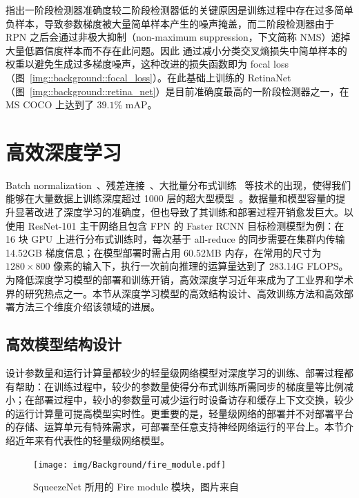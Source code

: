 \documentclass[
  fontset = mac,
]{shtthesis}
\begin{document}
\citet{lin2017focal} 指出一阶段检测器准确度较二阶段检测器低的关键原因是训练过程中存在过多简单负样本，导致参数梯度被大量简单样本产生的噪声掩盖，而二阶段检测器由于 RPN 之后会通过非极大抑制（non-maximum suppression，下文简称 NMS）滤掉大量低置信度样本而不存在此问题。因此 \citet{lin2017focal} 通过减小分类交叉熵损失中简单样本的权重以避免生成过多梯度噪声，这种改进的损失函数即为 focal loss （图~\ref{img::background::focal_loss}）。在此基础上训练的 RetinaNet （图~\ref{img::background::retina_net}）是目前准确度最高的一阶段检测器之一，在 MS COCO 上达到了 $39.1\%$ mAP。
\section{高效深度学习}
Batch normalization~\citep{ioffe2015batch}、残差连接~\citep{He_2016}、大批量分布式训练~\citep{goyal2017accurate} 等技术的出现，使得我们能够在大量数据上训练深度超过 1000 层的超大型模型~\citep{He_2016}。数据量和模型容量的提升显著改进了深度学习的准确度，但也导致了其训练和部署过程开销愈发巨大。以使用 ResNet-101 主干网络且包含 FPN 的 Faster RCNN 目标检测模型为例：在 16 块 GPU 上进行分布式训练时，每次基于 all-reduce 的同步需要在集群内传输 14.52GB 梯度信息；在模型部署时需占用 60.52MB 内存，在常用的尺寸为 $1280 \times 800$ 像素的输入下，执行一次前向推理的运算量达到了 283.14G FLOPS。为降低深度学习模型的部署和训练开销，高效深度学习近年来成为了工业界和学术界的研究热点之一。本节从深度学习模型的高效结构设计、高效训练方法和高效部署方法三个维度介绍该领域的进展。
\subsection{高效模型结构设计}
设计参数量和运行计算量都较少的轻量级网络模型对深度学习的训练、部署过程都有帮助：在训练过程中，较少的参数量使得分布式训练所需同步的梯度量等比例减小；在部署过程中，较小的参数量可减少运行时设备访存和缓存上下文交换，较少的运行计算量可提高模型实时性。更重要的是，轻量级网络的部署并不对部署平台的存储、运算单元有特殊需求，可部署至任意支持神经网络运行的平台上。本节介绍近年来有代表性的轻量级网络模型。

\begin{figure}[htb]
  \centering
  \texttt{[image: img/Background/fire\_module.pdf]}
  \caption{SqueezeNet 所用的 Fire module 模块，图片来自~\citet{iandola2016squeezenet}}
  \label{img::background::fire_module}
\end{figure}
\end{document}
